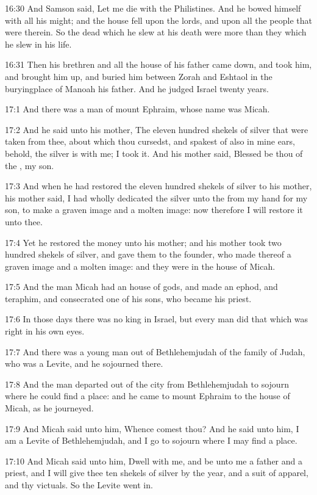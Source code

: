 16:30 And Samson said, Let me die with the Philistines. And he bowed
himself with all his might; and the house fell upon the lords, and
upon all the people that were therein. So the dead which he slew at
his death were more than they which he slew in his life.

16:31 Then his brethren and all the house of his father came down, and
took him, and brought him up, and buried him between Zorah and Eshtaol
in the buryingplace of Manoah his father. And he judged Israel twenty
years.

17:1 And there was a man of mount Ephraim, whose name was Micah.

17:2 And he said unto his mother, The eleven hundred shekels of silver
that were taken from thee, about which thou cursedst, and spakest of
also in mine ears, behold, the silver is with me; I took it. And his
mother said, Blessed be thou of the \LORD, my son.

17:3 And when he had restored the eleven hundred shekels of silver to
his mother, his mother said, I had wholly dedicated the silver unto
the \LORD from my hand for my son, to make a graven image and a molten
image: now therefore I will restore it unto thee.

17:4 Yet he restored the money unto his mother; and his mother took
two hundred shekels of silver, and gave them to the founder, who made
thereof a graven image and a molten image: and they were in the house
of Micah.

17:5 And the man Micah had an house of gods, and made an ephod, and
teraphim, and consecrated one of his sons, who became his priest.

17:6 In those days there was no king in Israel, but every man did that
which was right in his own eyes.

17:7 And there was a young man out of Bethlehemjudah of the family of
Judah, who was a Levite, and he sojourned there.

17:8 And the man departed out of the city from Bethlehemjudah to
sojourn where he could find a place: and he came to mount Ephraim to
the house of Micah, as he journeyed.

17:9 And Micah said unto him, Whence comest thou? And he said unto
him, I am a Levite of Bethlehemjudah, and I go to sojourn where I may
find a place.

17:10 And Micah said unto him, Dwell with me, and be unto me a father
and a priest, and I will give thee ten shekels of silver by the year,
and a suit of apparel, and thy victuals. So the Levite went in.

